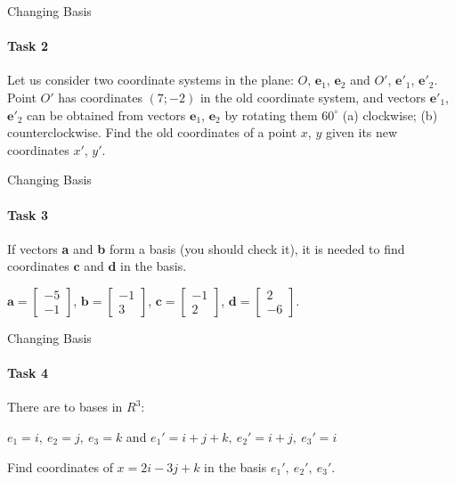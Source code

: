 \documentclass[aspectratio=169,notes]{beamer}
\begin{document}
\begin{frame}[t]{Changing Basis}
\framesubtitle{Task 2}
Let us consider two coordinate systems in the plane: $O$, $\textbf{e}_1$, $\textbf{e}_2$ and $O'$, $\textbf{e}'_1$, $\textbf{e}'_2$. Point $O'$ has coordinates $(7;-2)$ in the old coordinate system, and vectors $\textbf{e}'_1$, $\textbf{e}'_2$ can be obtained from vectors $\textbf{e}_1$, $\textbf{e}_2$ by rotating them $60^{\circ}$ (a) clockwise; (b) counterclockwise. Find the old coordinates of a point $x$, $y$ given its new coordinates $x'$, $y'$.
\end{frame}

\begin{frame}[t]{Changing Basis}
\framesubtitle{Task 3}
If vectors \textbf{a} and \textbf{b} form a basis (you should check it), it is needed to find coordinates $\textbf{c}$ and $\textbf{d}$ in the basis.\medskip

$\textbf{a}=\begin{bmatrix} -5 \\ -1 \end{bmatrix}$, $\textbf{b}=\begin{bmatrix} -1 \\ 3\end{bmatrix}$, 
$\textbf{c}=\begin{bmatrix} -1 \\ 2 \end{bmatrix}$, 
$\textbf{d}=\begin{bmatrix} 2 \\ -6\end{bmatrix}$.
\end{frame}

\begin{frame}[t]{Changing Basis}
\framesubtitle{Task 4}
There are to bases in $R^3$:

$e_1=i,\ e_2=j,\ e_3=k$ and $e_1'=i+j+k,\ e_2'=i+j,\ e_3'=i$

Find coordinates of $x=2i-3j+k$ in the basis $e_1',\ e_2',\ e_3'$.
\end{frame}
\end{document}
